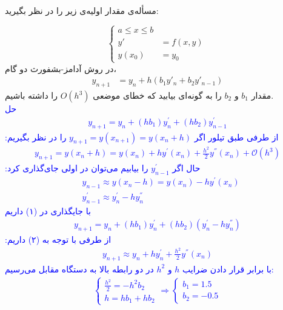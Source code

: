 \\
مسأله‌ی مقدار اولیه‌ی زیر را در نظر بگیرید:

\begin{equation*}
    \begin{cases}
        a \leq x \leq b \\
        y' &= f(x, y) \\
        y(x_0) &= y_0
    \end{cases}\,
\end{equation*}
در روش آدامز-بشفورث دو گام،
\begin{align*}
y_{n+1} &= y_n + h(b_1y'_n + b_2y'_{n-1})
\end{align*}
مقدار
$b_1$
و
$b_2$
را به گونه‌ای بیابید که خطای موضعی
$O(h^3)$
را داشته باشیم.
\\
\textcolor{blue}{حل
\begin{align}
    y_{n + 1} = y_n + (hb_1) y^{'}_n + (hb_2) y^{'}_{n - 1}
\end{align}
از طرفی طبق تیلور اگر
$y_{n + 1} = y (x_{n + 1}) = y(x_{n} + h)$
را در نظر بگیریم:
\begin{align}
    y_{n + 1} = y(x_n + h) = y(x_n) + h y^{'}(x_n) + \frac{h^2}{2} y^{''}(x_n) + \mathcal{O}(h^3)
\end{align}
حال اگر 
$y^{'}_{n - 1}$
را بیابیم می‌توان در اولی جای‌گذاری کرد:
\begin{align*}
    &y_{n - 1} \approx y (x_n - h) = y(x_n) - hy^{'}(x_n) \\
    &y^{'}_{n - 1} \approx y^{'}_{n} - h y^{''}_n
\end{align*}
با جایگذاری در
(۱)
داریم 
\begin{align*}
    y_{n + 1} = y_n + (hb_1) y^{'}_n + (h b_2) (y^{'}_n - h y^{''}_n)
\end{align*}
از طرفی با توجه به  
(۲)
داریم:
\begin{align*}
    y_{n + 1} \approx y_n + h y^{'}_n + \frac{h^2}{2} y^{''}(x_n)
\end{align*}
با برابر قرار دادن ضرایب 
$h$
و
$h^2$
در دو رابطه بالا به دستگاه مقابل می‌رسیم:
\begin{align*}
    \begin{cases}
        \frac{h^2}{2} = -h^2 b_2 \\
        h = h b_1 + h b_2 
    \end{cases} \Rightarrow \begin{cases}
        b_1 = 1.5 \\
        b_2 = -0.5
    \end{cases}
\end{align*}
}
